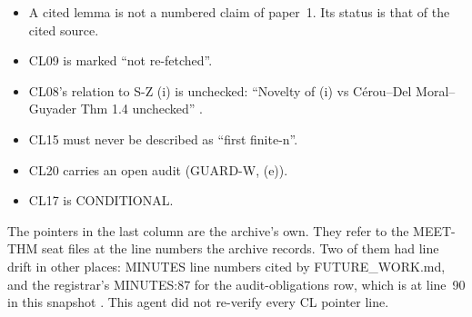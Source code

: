 \begin{notproved}
\begin{itemize}
\item A cited lemma is not a numbered claim of paper~1. Its status is that of the cited source.
\item CL09 is marked ``not re-fetched''.
\item CL08's relation to S-Z (i) is unchecked: ``Novelty of (i) vs Cérou–Del Moral–Guyader Thm 1.4 unchecked'' .
\item CL15 must never be described as ``first finite-n''.
\item CL20 carries an open audit (GUARD-W, (e)).
\item CL17 is CONDITIONAL.
\end{itemize}
\end{notproved}
\begin{uncertain}
The pointers in the last column are the archive's own. They refer to the MEET-THM seat files at the line numbers the archive records. Two of them had line drift in other places: MINUTES line numbers cited by FUTURE\_WORK.md, and the registrar's MINUTES:87 for the audit-obligations row, which is at line~90 in this snapshot . This agent did not re-verify every CL pointer line.
\end{uncertain}


